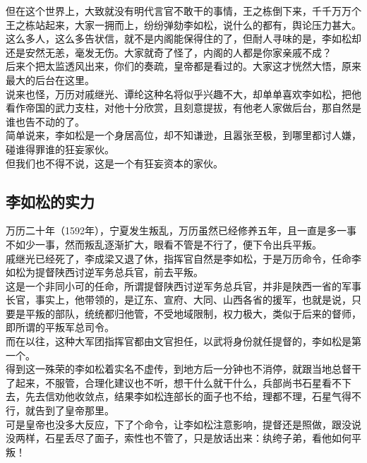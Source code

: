 \begin{multicols}{\theparacolNo}
但在这个世界上，大致就没有明代言官不敢干的事情，王之栋倒下来，千千万万个王之栋站起来，大家一拥而上，纷纷弹劾李如松，说什么的都有，舆论压力甚大。\\

这么多人，这么多告状信，就不是内阁能保得住的了，但耐人寻味的是，李如松却还是安然无恙，毫发无伤。大家就奇了怪了，内阁的人都是你家亲戚不成？\\

后来个把太监透风出来，你们的奏疏，皇帝都是看过的。大家这才恍然大悟，原来最大的后台在这里。\\

说来也怪，万历对戚继光、谭纶这种名将似乎兴趣不大，却单单喜欢李如松，把他看作帝国的武力支柱，对他十分欣赏，且刻意提拔，有他老人家做后台，那自然是谁也告不动的了。\\

简单说来，李如松是一个身居高位，却不知谦逊，且嚣张至极，到哪里都讨人嫌，碰谁得罪谁的狂妄家伙。\\

但我们也不得不说，这是一个有狂妄资本的家伙。\\

\subsection{李如松的实力}
万历二十年（1592年），宁夏发生叛乱，万历虽然已经修养五年，且一直是多一事不如少一事，然而叛乱逐渐扩大，眼看不管是不行了，便下令出兵平叛。\\

戚继光已经死了，李成梁又退了休，指挥官自然是李如松，于是万历命令，任命李如松为提督陕西讨逆军务总兵官，前去平叛。\\

这是一个非同小可的任命，所谓提督陕西讨逆军务总兵官，并非是陕西一省的军事长官，事实上，他带领的，是辽东、宣府、大同、山西各省的援军，也就是说，只要是平叛的部队，统统都归他管，不受地域限制，权力极大，类似于后来的督师，即所谓的平叛军总司令。\\

而在以往，这种大军团指挥官都由文官担任，以武将身份就任提督的，李如松是第一个。\\

得到这一殊荣的李如松着实名不虚传，到地方后一分钟也不消停，就跟当地总督干了起来，不服管，合理化建议也不听，想干什么就干什么，兵部尚书石星看不下去，先去信劝他收敛点，结果李如松连部长的面子也不给，理都不理，石星气得不行，就告到了皇帝那里。\\

可是皇帝也没多大反应，下了个命令，让李如松注意影响，提督还是照做，跟没说没两样，石星丢尽了面子，索性也不管了，只是放话出来：纨绔子弟，看他如何平叛！\\


\end{multicols}
